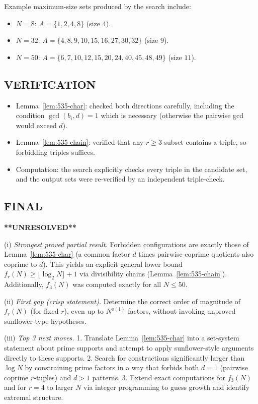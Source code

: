 Example maximum-size sets produced by the search include:
\begin{itemize}
\item $N=8$: $A=\{1,2,4,8\}$ (size $4$).
\item $N=32$: $A=\{4,8,9,10,15,16,27,30,32\}$ (size $9$).
\item $N=50$: $A=\{6,7,10,12,15,20,24,40,45,48,49\}$ (size $11$).
\end{itemize}

\subsection*{VERIFICATION}
\begin{itemize}
\item Lemma~\ref{lem:535-char}: checked both directions carefully, including the condition $\gcd(b_i,d)=1$ which is necessary (otherwise the pairwise gcd would exceed $d$).
\item Lemma~\ref{lem:535-chain}: verified that any $r\ge 3$ subset contains a triple, so forbidding triples suffices.
\item Computation: the search explicitly checks every triple in the candidate set, and the output sets were re-verified by an independent triple-check.
\end{itemize}

\subsection*{FINAL}
\textbf{**UNRESOLVED**}

(i) \emph{Strongest proved partial result.} Forbidden configurations are exactly those of Lemma~\ref{lem:535-char} (a common factor $d$ times pairwise-coprime quotients also coprime to $d$). This yields an explicit general lower bound $f_r(N)\ge \lfloor \log_2 N\rfloor+1$ via divisibility chains (Lemma~\ref{lem:535-chain}). Additionally, $f_3(N)$ was computed exactly for all $N\le 50$.

(ii) \emph{First gap (crisp statement).} Determine the correct order of magnitude of $f_r(N)$ (for fixed $r$), even up to $N^{o(1)}$ factors, without invoking unproved sunflower-type hypotheses.

(iii) \emph{Top 3 next moves.}
1. Translate Lemma~\ref{lem:535-char} into a set-system statement about prime supports and attempt to apply sunflower-style arguments directly to these supports.
2. Search for constructions significantly larger than $\log N$ by constraining prime factors in a way that forbids both $d=1$ (pairwise coprime $r$-tuples) and $d>1$ patterns.
3. Extend exact computations for $f_3(N)$ and for $r=4$ to larger $N$ via integer programming to guess growth and identify extremal structure.

